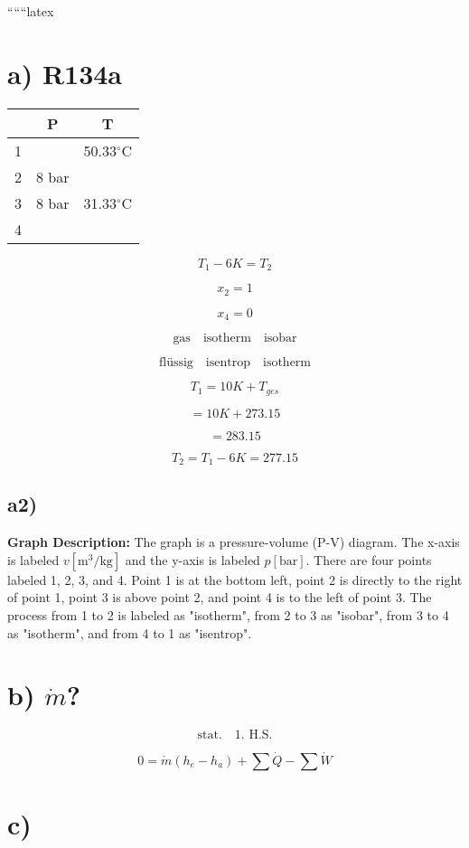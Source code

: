 
``````latex


\section*{a) R134a}

\begin{tabular}{|c|c|c|}
\hline
 & P & T \\
\hline
1 & & 50.33$^\circ$C \\
\hline
2 & 8 bar & \\
\hline
3 & 8 bar & 31.33$^\circ$C \\
\hline
4 & & \\
\hline
\end{tabular}

\[
T_1 - 6K = T_2
\]

\[
x_2 = 1
\]

\[
x_4 = 0
\]

\[
\text{gas} \quad \text{isotherm} \quad \text{isobar}
\]

\[
\text{flüssig} \quad \text{isentrop} \quad \text{isotherm}
\]

\[
T_1 = 10K + T_{ges}
\]

\[
= 10K + 273.15
\]

\[
= 283.15
\]

\[
T_2 = T_1 - 6K = 277.15
\]

\subsection*{a2)}

\textbf{Graph Description:} The graph is a pressure-volume (P-V) diagram. The x-axis is labeled $v [\text{m}^3/\text{kg}]$ and the y-axis is labeled $p [\text{bar}]$. There are four points labeled 1, 2, 3, and 4. Point 1 is at the bottom left, point 2 is directly to the right of point 1, point 3 is above point 2, and point 4 is to the left of point 3. The process from 1 to 2 is labeled as "isotherm", from 2 to 3 as "isobar", from 3 to 4 as "isotherm", and from 4 to 1 as "isentrop".

\section*{b) $\dot{m}$?}

\[
\text{stat.} \quad \text{1. H.S.}
\]

\[
0 = \dot{m} (h_e - h_a) + \sum \dot{Q} - \sum \dot{W}
\]

\section*{c)}

